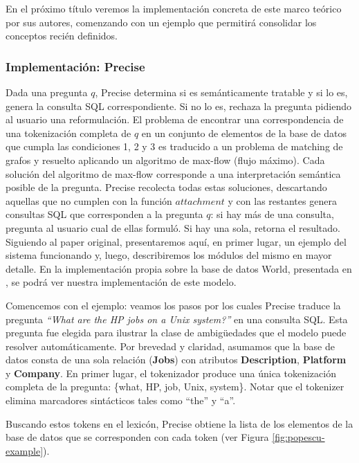 En el próximo título veremos la implementación concreta de este marco teórico por sus autores, comenzando con un ejemplo que permitirá consolidar los conceptos recién definidos.

\subsubsection*{Implementación: Precise}

Dada una pregunta $q$, Precise determina si es semánticamente tratable y si lo es, genera la consulta SQL correspondiente. Si no lo es, rechaza la pregunta pidiendo al usuario una reformulación. El problema de encontrar una correspondencia de una tokenización completa de $q$ en un conjunto de elementos de la base de datos que cumpla las condiciones 1, 2 y 3 es traducido a un problema de matching de grafos y resuelto aplicando un algoritmo de max-flow (flujo máximo). Cada solución del algoritmo de max-flow corresponde a una interpretación semántica posible de la pregunta. Precise recolecta todas estas soluciones, descartando aquellas que no cumplen con la función $attachment$ y con las restantes genera consultas SQL que corresponden a la pregunta $q$: si hay más de una consulta, pregunta al usuario cual de ellas formuló. Si hay una sola, retorna el resultado.
Siguiendo al paper original, presentaremos aquí, en primer lugar, un ejemplo del sistema funcionando y, luego, describiremos los módulos del mismo en mayor detalle. En la implementación propia sobre la base de datos World, presentada en , se podrá ver nuestra implementación de este modelo.

\medskip

Comencemos con el ejemplo: veamos los pasos por los cuales Precise traduce la pregunta \textit{``What are the HP jobs on a Unix system?''} en una consulta SQL. Esta pregunta fue elegida para ilustrar la clase de ambigüedades que el modelo puede resolver automáticamente. Por brevedad y claridad, asumamos que la base de datos consta de una sola relación (\textbf{Jobs}) con atributos \textbf{Description}, \textbf{Platform} y  \textbf{Company}. En primer lugar, el tokenizador produce una única tokenización completa de la pregunta: \{what, HP, job, Unix, system\}. Notar que el tokenizer elimina marcadores sintácticos tales como ``the'' y ``a''.

Buscando estos tokens en el lexicón, Precise obtiene la lista de los elementos de la base de datos que se corresponden con cada token (ver Figura \ref{fig:popescu-example}).

